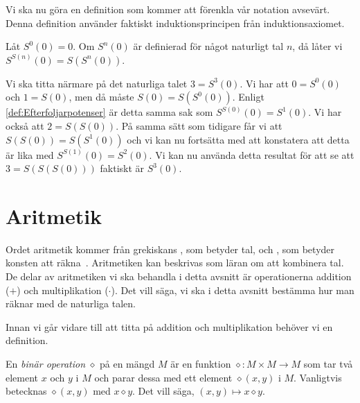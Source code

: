 Vi ska nu göra en definition som kommer att förenkla vår notation avsevärt.
Denna definition använder faktiskt induktionsprincipen från induktionsaxiomet.
\begin{definition}\label{def:Efterfoljarpotenser}
  Låt \(S^0(0) = 0\).
  Om \(S^n(0)\) är definierad för något naturligt tal \(n\), då låter vi
  \(S^{S(n)}(0) = S(S^n(0))\).
\end{definition}
\begin{example}
  Vi ska titta närmare på det naturliga talet \(3=S^3(0)\).
  Vi har att \(0=S^0(0)\) och \(1=S(0)\), men då måste \(S(0)=S(S^0(0))\).
  Enligt \cref{def:Efterfoljarpotenser} är detta samma sak som
  \(S^{S(0)}(0)=S^1(0)\).
  Vi har också att \(2=S(S(0))\).
  På samma sätt som tidigare får vi att \(S(S(0))=S(S^1(0))\) och vi kan nu
  fortsätta med att konstatera att detta är lika med \(S^{S(1)}(0)=S^2(0)\).
  Vi kan nu använda detta resultat för att se att \(3=S(S(S(0)))\) faktiskt
  är \(S^3(0)\).
\end{example}




\section{Aritmetik}
Ordet aritmetik kommer från grekiskans \emph{},
som betyder tal, och \emph{}, som betyder konsten att
räkna~\cite{OED2013arithmetic}.
Aritmetiken kan beskrivas som läran om att kombinera tal.
De delar av aritmetiken vi ska behandla i detta avsnitt är operationerna
addition (\(+\)) och multiplikation (\(\cdot\)).
Det vill säga, vi ska i detta avsnitt bestämma hur man räknar med de naturliga
talen.

Innan vi går vidare till att titta på addition och multiplikation behöver vi en
definition.
\begin{definition}
  En \emph{binär operation} \(\diamond\) på en mängd
  \(M\) är en funktion \(\diamond\colon M\times M\to M\) som tar två
  element \(x\) och \(y\) i \(M\) och parar dessa med ett element
  \(\diamond(x,y)\) i \(M\).
  Vanligtvis betecknas \(\diamond(x,y)\) med \(x\diamond y\).
  Det vill säga, \((x,y)\mapsto x\diamond y\).
\end{definition}


